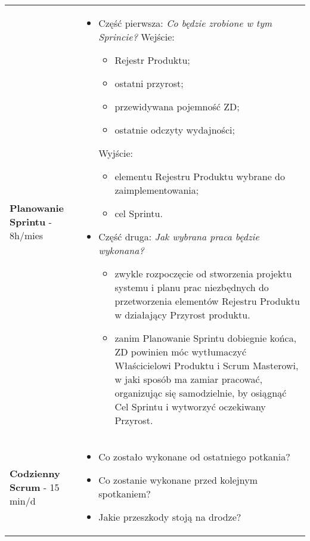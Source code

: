 \documentclass[a4paper]{article}
\begin{document}
\begin{table}[H]
\begin{center}
\begin{tabular}{ p{} p{} }
                \cmidrule(r){1-1}\cmidrule(l){2-2}
                \textbf{Planowanie Sprintu} - 8h/mies
                &
                \begin{itemize}
                    \item Część pierwsza: \textit{Co będzie zrobione w tym Sprincie?}
                    Wejście:
                    \begin{itemize}
                        \item Rejestr Produktu;
                        \item ostatni przyrost;
                        \item przewidywana pojemność ZD;
                        \item ostatnie odczyty wydajności;
                    \end{itemize}
                    Wyjście:
                    \begin{itemize}
                        \item elementu Rejestru Produktu
                        wybrane do zaimplementowania;
                        \item cel Sprintu.
                    \end{itemize}
                    \item Część druga: \textit{Jak wybrana praca będzie wykonana?}
                    \begin{itemize}
                        \item zwykle rozpoczęcie od stworzenia projektu systemu i planu prac
                        niezbędnych do przetworzenia elementów Rejestru Produktu w działający Przyrost produktu.
                        \item zanim Planowanie Sprintu dobiegnie końca, ZD powinien móc wytłumaczyć Właścicielowi
                        Produktu i Scrum Masterowi, w jaki sposób ma zamiar pracować, organizując się samodzielnie, by osiągnąć Cel
                        Sprintu i wytworzyć oczekiwany Przyrost.
                    \end{itemize}
                \end{itemize}
                \\

                \cmidrule(r){1-1}\cmidrule(l){2-2}
                \textbf{Codzienny Scrum} - 15 min/d
                &
                \begin{itemize}
                    \item Co zostało wykonane od ostatniego potkania?
                    \item Co zostanie wykonane przed kolejnym spotkaniem?
                    \item Jakie przeszkody stoją na drodze?
                \end{itemize}
                \\


\end{tabular}
\end{center}
\end{table}
\end{document}
